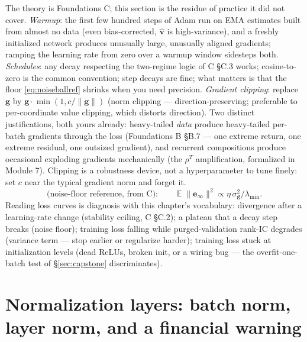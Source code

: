 \documentclass[11pt]{article}
\numberwithin{equation}{section}
\theoremstyle{plain}
\theoremstyle{definition}
\theoremstyle{remark}
\DeclareMathOperator{\E}{\mathbb{E}}
\begin{document}
The theory is Foundations C; this section is the residue of practice it did not cover. \emph{Warmup}: the first few hundred steps of Adam run on EMA estimates built from almost no data (even bias-corrected, $\hat{\bm v}$ is high-variance), and a freshly initialized network produces unusually large, unusually aligned gradients; ramping the learning rate from zero over a warmup window sidesteps both. \emph{Schedules}: any decay respecting the two-regime logic of C \S C.3 works; cosine-to-zero is the common convention; step decays are fine; what matters is that the floor \eqref{eq:noiseballref} shrinks when you need precision. \emph{Gradient clipping}: replace $\bm g$ by $\bm g \cdot \min(1, c/\|\bm g\|)$ (norm clipping --- direction-preserving; preferable to per-coordinate value clipping, which distorts direction). Two distinct justifications, both yours already: heavy-tailed \emph{data} produce heavy-tailed per-batch gradients through the loss (Foundations B \S B.7 --- one extreme return, one extreme residual, one outsized gradient), and recurrent compositions produce occasional exploding gradients mechanically (the $\rho^T$ amplification, formalized in Module 7). Clipping is a robustness device, not a hyperparameter to tune finely: set $c$ near the typical gradient norm and forget it.
\begin{equation}
\text{(noise-floor reference, from C):}\qquad \E\|\bm e_\infty\|^2 \propto \eta\,\sigma_{\bm g}^2/\lambda_{\min}.
\label{eq:noiseballref}
\end{equation}
Reading loss curves is diagnosis with this chapter's vocabulary: divergence after a learning-rate change (stability ceiling, C \S C.2); a plateau that a decay step breaks (noise floor); training loss falling while purged-validation rank-IC degrades (variance term --- stop earlier or regularize harder); training loss stuck at initialization levels (dead ReLUs, broken init, or a wiring bug --- the overfit-one-batch test of \S\ref{sec:capstone} discriminates).

\section{Normalization layers: batch norm, layer norm, and a financial warning}\label{sec:bn}
\end{document}
